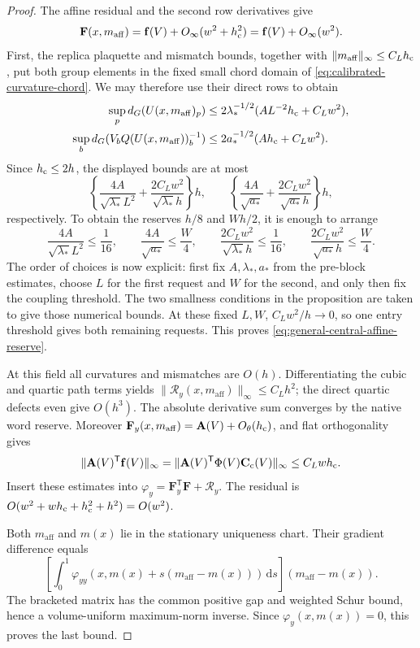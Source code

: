 \documentclass[11pt,reqno]{amsart}
\numberwithin{equation}{section}
\theoremstyle{definition}
\theoremstyle{remark}
\newcommand{\dd}{\mathrm d}
\begin{document}
\begin{proof}
The affine residual and the second row derivatives give
\[
 \mathbf F(x,m_{\mathrm{aff}})=\mathbf f(V)+O_\infty(w^2+h_{\rm c}^2)
                         =\mathbf f(V)+O_\infty(w^2).
\]
First, the replica plaquette and mismatch bounds, together with
\(\|m_{\mathrm{aff}}\|_\infty\le C_Lh_{\rm c}\), put both group elements
in the fixed small chord domain of
\eqref{eq:calibrated-curvature-chord}. We may therefore use
their direct rows to obtain
\begin{align*}
 \sup_p d_G(U(x,m_{\mathrm{aff}})_p)
      &\le2\lambda_*^{-1/2}(AL^{-2}h_{\rm c}+C_Lw^2),\\
 \sup_b d_G(V_bQ(U(x,m_{\mathrm{aff}}))_b^{-1})
      &\le2a_*^{-1/2}(Ah_{\rm c}+C_Lw^2).
\end{align*}
Since \(h_{\rm c}\le2h\), the displayed bounds are at most
\[
 \left\{\frac{4A}{\sqrt{\lambda_*}L^2}
                  +\frac{2C_Lw^2}{\sqrt{\lambda_*}h}\right\}h,
 \qquad
 \left\{\frac{4A}{\sqrt{a_*}}
                  +\frac{2C_Lw^2}{\sqrt{a_*}h}\right\}h,
\]
respectively. To obtain the reserves \(h/8\) and \(Wh/2\), it is
enough to arrange
\[
 \frac{4A}{\sqrt{\lambda_*}L^2}\le\frac1{16},\qquad
 \frac{4A}{\sqrt{a_*}}\le\frac W4,\qquad
 \frac{2C_Lw^2}{\sqrt{\lambda_*}h}\le\frac1{16},\qquad
 \frac{2C_Lw^2}{\sqrt{a_*}h}\le\frac W4.
\]
The order of choices is now explicit: first fix \(A,\lambda_*,a_*\)
from the pre-block estimates, choose \(L\) for the first request
and \(W\) for the second, and only then fix the coupling threshold.
The two smallness conditions in the proposition are taken to
give those numerical bounds. At these fixed \(L,W\),
\(C_Lw^2/h\to0\), so one entry threshold gives both remaining
requests. This proves \eqref{eq:general-central-affine-reserve}.

At this field all curvatures and mismatches are \(O(h)\).
Differentiating the cubic and quartic path terms yields
\(\|\mathcal R_y(x,m_{\mathrm{aff}})\|_\infty\le C_Lh^2\); the direct
quartic defects even give \(O(h^3)\). The absolute derivative
sum converges by the native word reserve. Moreover
\(\mathbf F_y(x,m_{\mathrm{aff}})=\mathbf A(V)+O_\theta(h_{\rm c})\), and
flat orthogonality gives
\[
 \|\mathbf A(V)^{\mathsf T}\mathbf f(V)\|_\infty
   =\|\mathbf A(V)^{\mathsf T}\Phi(V)\mathbf C_{\rm c}(V)\|_\infty
                                                    \le C_Lwh_{\rm c}.
\]
Insert these estimates into
\(\varphi_y=\mathbf F_y^{\mathsf T}\mathbf F+\mathcal R_y\).
The residual is \(O(w^2+wh_{\rm c}+h_{\rm c}^2+h^2)=O(w^2)\).

Both \(m_{\mathrm{aff}}\) and \(m(x)\) lie in the stationary uniqueness
chart. Their gradient difference equals
\[
 \left[\int_0^1\varphi_{yy}(x,m(x)+s(m_{\mathrm{aff}}-m(x)))\,\dd s\right]
                                                   (m_{\mathrm{aff}}-m(x)).
\]
The bracketed matrix has the common positive gap and weighted
Schur bound, hence a volume-uniform maximum-norm inverse.
Since \(\varphi_y(x,m(x))=0\), this proves the last bound.
\end{proof}
\end{document}
